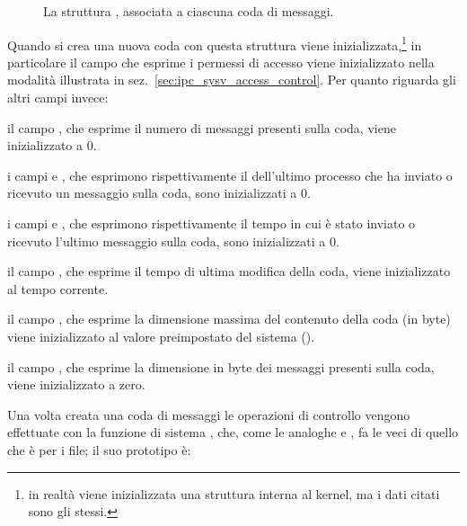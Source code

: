 \begin{figure}[!htb]
  \footnotesize \centering
  \begin{minipage}[c]{.91\textwidth}
  \end{minipage} 
  \normalsize 
  \caption{La struttura , associata a ciascuna coda di
    messaggi.}
  \label{fig:ipc_msqid_ds}
\end{figure}

Quando si crea una nuova coda con  questa struttura viene
inizializzata,\footnote{in realtà viene inizializzata una struttura interna al
  kernel, ma i dati citati sono gli stessi.} in particolare il campo
 che esprime i permessi di accesso viene inizializzato nella
modalità illustrata in sez.~\ref{sec:ipc_sysv_access_control}. Per quanto
riguarda gli altri campi invece:
\begin{itemize*}
\item il campo , che esprime il numero di messaggi presenti
  sulla coda, viene inizializzato a 0.
\item i campi  e , che esprimono
  rispettivamente il  dell'ultimo processo che ha inviato o ricevuto
  un messaggio sulla coda, sono inizializzati a 0.
\item i campi  e , che esprimono
  rispettivamente il tempo in cui è stato inviato o ricevuto l'ultimo
  messaggio sulla coda, sono inizializzati a 0.
\item il campo , che esprime il tempo di ultima modifica della
  coda, viene inizializzato al tempo corrente.
\item il campo , che esprime la dimensione massima del
  contenuto della coda (in byte) viene inizializzato al valore preimpostato
  del sistema ().
\item il campo , che esprime la dimensione in byte dei
  messaggi presenti sulla coda, viene inizializzato a zero.
\end{itemize*}

Una volta creata una coda di messaggi le operazioni di controllo vengono
effettuate con la funzione di sistema , che, come le analoghe
 e , fa le veci di quello che  è per i
file; il suo prototipo è:

